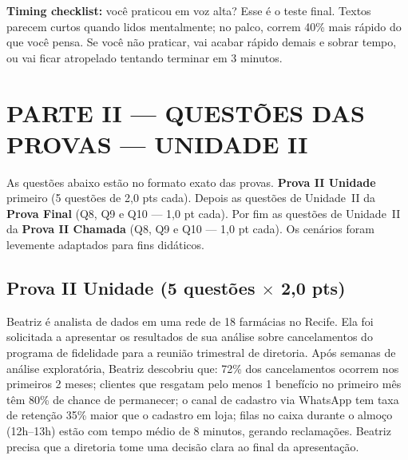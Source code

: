 \textbf{Timing checklist:} você praticou em voz alta? Esse é o teste final. Textos parecem curtos quando lidos mentalmente; no palco, correm 40\% mais rápido do que você pensa. Se você não praticar, vai acabar rápido demais e sobrar tempo, ou vai ficar atropelado tentando terminar em 3 minutos.

\section*{\Large PARTE II --- QUESTÕES DAS PROVAS --- UNIDADE II}

As questões abaixo estão no formato exato das provas. \textbf{Prova II Unidade} primeiro (5 questões de 2,0 pts cada). Depois as questões de Unidade~II da \textbf{Prova Final} (Q8, Q9 e Q10 --- 1,0 pt cada). Por fim as questões de Unidade~II da \textbf{Prova II Chamada} (Q8, Q9 e Q10 --- 1,0 pt cada). Os cenários foram levemente adaptados para fins didáticos.

\subsection*{Prova II Unidade (5 questões $\times$ 2,0 pts)}

Beatriz é analista de dados em uma rede de 18 farmácias no Recife. Ela foi solicitada a apresentar os resultados de sua análise sobre cancelamentos do programa de fidelidade para a reunião trimestral de diretoria. Após semanas de análise exploratória, Beatriz descobriu que: 72\% dos cancelamentos ocorrem nos primeiros 2 meses; clientes que resgatam pelo menos 1 benefício no primeiro mês têm 80\% de chance de permanecer; o canal de cadastro via WhatsApp tem taxa de retenção 35\% maior que o cadastro em loja; filas no caixa durante o almoço (12h--13h) estão com tempo médio de 8 minutos, gerando reclamações. Beatriz precisa que a diretoria tome uma decisão clara ao final da apresentação.

